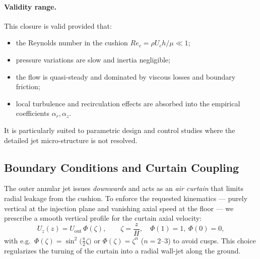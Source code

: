 \documentclass[11pt,a4paper]{article}
\begin{document}
\paragraph{Validity range.}
This closure is valid provided that:
\begin{itemize}
  \item the Reynolds number in the cushion $Re_c=\rho U_c h/\mu \ll 1$;
  \item pressure variations are slow and inertia negligible;
  \item the flow is quasi-steady and dominated by viscous losses and boundary friction;
  \item local turbulence and recirculation effects are absorbed into the empirical coefficients $\alpha_r,\alpha_z$.
\end{itemize}
It is particularly suited to parametric design and control studies where the detailed jet micro-structure is not resolved.


\subsection{Boundary Conditions and Curtain Coupling} \label{sec:boundaryconditions}
The outer annular jet issues \emph{downwards} and acts as an \emph{air curtain} that limits radial leakage from the cushion. 
To enforce the requested kinematics --- purely vertical at the injection plane and vanishing axial speed at the floor --- we prescribe a smooth vertical profile for the curtain axial velocity:
\begin{equation}
  U_z(z) = U_{\mathrm{out}}\,\Phi\!\left(\zeta\right), 
  \qquad \zeta=\frac{z}{H},\quad \Phi(1)=1,\ \Phi(0)=0,
  \label{eq:Uz_profile}
\end{equation}
with e.g.\ $\Phi(\zeta)=\sin^2\!\big(\tfrac{\pi}{2}\zeta\big)$ or $\Phi(\zeta)=\zeta^n$ ($n=2$--$3$) to avoid cusps. 
This choice regularizes the turning of the curtain into a radial wall-jet along the ground.
\end{document}
